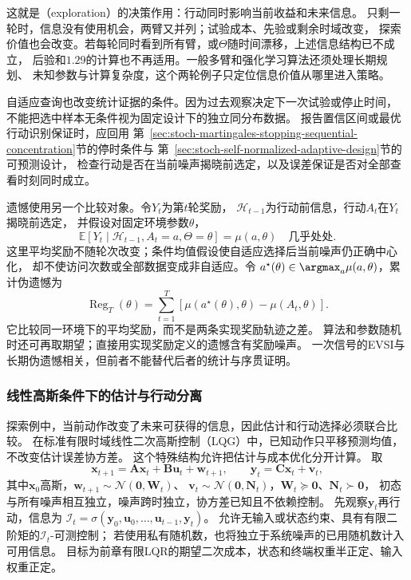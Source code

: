 这就是（exploration）的决策作用：行动同时影响当前收益和未来信息。
只剩一轮时，信息没有使用机会，两臂又并列；试验成本、先验或剩余时域改变，
探索价值也会改变。若每轮同时看到所有臂，或$\Theta$随时间漂移，上述信息结构已不成立，
后验和$1.29$的计算也不再适用。一般多臂和强化学习算法还须处理长期规划、
未知参数与计算复杂度，这个两轮例子只定位信息价值从哪里进入策略。

自适应查询也改变统计证据的条件。因为过去观察决定下一次试验或停止时间，
不能把选中样本无条件视为固定设计下的独立同分布数据。
报告置信区间或最优行动识别保证时，应回用
第~\ref{sec:stoch-martingales-stopping-sequential-concentration}节的停时条件与
第~\ref{sec:stoch-self-normalized-adaptive-design}节的可预测设计，
检查行动是否在当前噪声揭晓前选定，以及误差保证是否对全部查看时刻同时成立。

遗憾使用另一个比较对象。令$Y_t$为第$t$轮奖励，
$\mathcal H_{t-1}$为行动前信息，行动$A_t$在$Y_t$揭晓前选定，
并假设对固定环境参数$\theta$，
\[
  \mathbb E[Y_t\mid\mathcal H_{t-1},A_t=a,\Theta=\theta]
  =\mu(a,\theta)\quad\text{几乎处处}.
\]
这里平均奖励不随轮次改变；条件均值假设使自适应选择后当前噪声仍正确中心化，
却不使访问次数或全部数据变成非自适应。令
$a^\star(\theta)\in\argmax_a\mu(a,\theta)$，累计伪遗憾为
\[
  \operatorname{Reg}_T(\theta)
  =\sum_{t=1}^T[\mu(a^\star(\theta),\theta)-\mu(A_t,\theta)].
\]
它比较同一环境下的平均奖励，而不是两条实现奖励轨迹之差。
算法和参数随机时还可再取期望；直接用实现奖励定义的遗憾含有奖励噪声。
一次信号的EVSI与长期伪遗憾相关，但前者不能替代后者的统计与序贯证明。

\subsubsection{线性高斯条件下的估计与行动分离}

探索例中，当前动作改变了未来可获得的信息，因此估计和行动选择必须联合比较。
在标准有限时域线性二次高斯控制（LQG）中，已知动作只平移预测均值，不改变估计误差协方差。
这个特殊结构允许把估计与成本优化分开计算。
取
\[
  \bm x_{t+1}=\bm A\bm x_t+\bm B\bm u_t+\bm w_{t+1},
  \qquad \bm y_t=\bm C\bm x_t+\bm v_t,
\]
其中$\bm x_0$高斯，$\bm w_{t+1}\sim\mathcal N(\bm0,\bm W_t)$、
$\bm v_t\sim\mathcal N(\bm0,\bm N_t)$，$\bm W_t\succeq\bm0$、$\bm N_t\succ\bm0$，
初态与所有噪声相互独立，噪声跨时独立，协方差已知且不依赖控制。
先观察$\bm y_t$再行动，信息为
$\mathcal I_t=\sigma(\bm y_0,\bm u_0,\ldots,\bm u_{t-1},\bm y_t)$。
允许无输入或状态约束、具有有限二阶矩的$\mathcal I_t$-可测控制；
若使用私有随机数，也将独立于系统噪声的已用随机数计入可用信息。
目标为前章有限LQR的期望二次成本，状态和终端权重半正定、输入权重正定。

